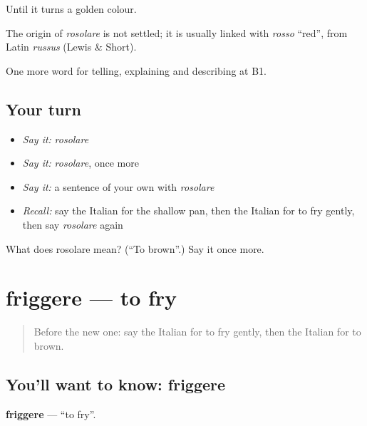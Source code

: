 Until it turns a golden colour.

\begin{cousinweb}
The origin of \emph{rosolare} is not settled; it is usually linked with \emph{rosso} \textquotedblleft{}red\textquotedblright{}, from Latin \emph{russus} (Lewis \& Short).
\end{cousinweb}

\begin{grammarlens}[title={What you've built}]
One more word for telling, explaining and describing at B1.
\end{grammarlens}

\subsection*{Your turn}
\begin{itemize}
\raggedright
  \item \emph{Say it:} \emph{rosolare}
  \item \emph{Say it:} \emph{rosolare}, once more
  \item \emph{Say it:} a sentence of your own with \emph{rosolare}
  \item \emph{Recall:} say the Italian for the shallow pan, then the Italian for to fry gently, then say \emph{rosolare} again
\end{itemize}

\begin{tcolorbox}[breakable,colback=teal!4,colframe=teal!35!black,title={Before you move on}]
What does rosolare mean? (\textquotedblleft{}To brown\textquotedblright{}.) Say it once more.
\end{tcolorbox}
\section[friggere]{friggere — to fry}

\label{lesson:IT-C334-friggere}



\begin{quote}
Before the new one: say the Italian for to fry gently, then the Italian for to brown.
\end{quote}

\subsection*{You'll want to know: friggere}
\textbf{friggere} — \textquotedblleft{}to fry\textquotedblright{}.

